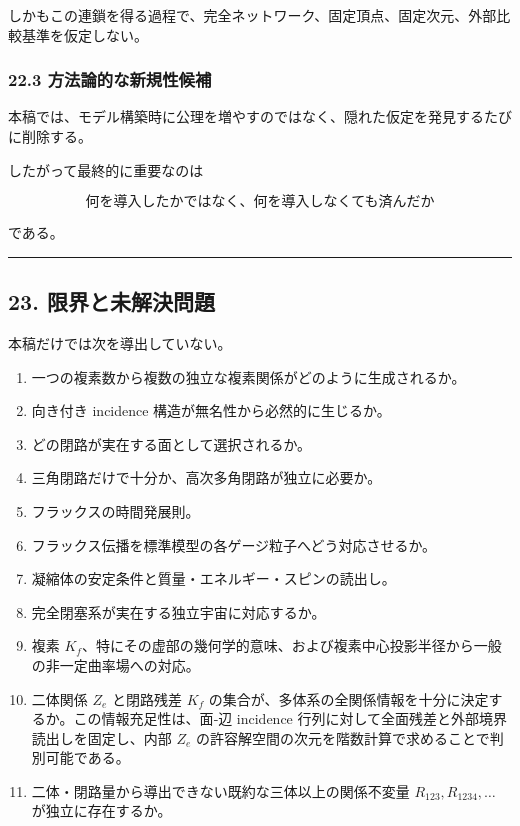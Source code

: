\documentclass[
  a4paper,
]{ltjsarticle}
\providecommand{\tightlist}{%
  \setlength{\itemsep}{0pt}\setlength{\parskip}{0pt}}
\begin{document}
しかもこの連鎖を得る過程で、完全ネットワーク、固定頂点、固定次元、外部比較基準を仮定しない。

\subsubsection{22.3
方法論的な新規性候補}\label{ux65b9ux6cd5ux8ad6ux7684ux306aux65b0ux898fux6027ux5019ux88dc}

本稿では、モデル構築時に公理を増やすのではなく、隠れた仮定を発見するたびに削除する。

したがって最終的に重要なのは

\[
\boxed{\text{何を導入したかではなく、何を導入しなくても済んだか}}
\]

である。

\begin{center}\rule{0.5\linewidth}{0.5pt}\end{center}

\subsection{23.
限界と未解決問題}\label{ux9650ux754cux3068ux672aux89e3ux6c7aux554fux984c}

本稿だけでは次を導出していない。

\begin{enumerate}
\def\labelenumi{\arabic{enumi}.}
\tightlist
\item
  一つの複素数から複数の独立な複素関係がどのように生成されるか。
\item
  向き付き incidence 構造が無名性から必然的に生じるか。
\item
  どの閉路が実在する面として選択されるか。
\item
  三角閉路だけで十分か、高次多角閉路が独立に必要か。
\item
  フラックスの時間発展則。
\item
  フラックス伝播を標準模型の各ゲージ粒子へどう対応させるか。
\item
  凝縮体の安定条件と質量・エネルギー・スピンの読出し。
\item
  完全閉塞系が実在する独立宇宙に対応するか。
\item
  複素
  \(K_f\)、特にその虚部の幾何学的意味、および複素中心投影半径から一般の非一定曲率場への対応。
\item
  二体関係 \(Z_e\) と閉路残差 \(K_f\)
  の集合が、多体系の全関係情報を十分に決定するか。この情報充足性は、面‐辺
  incidence 行列に対して全面残差と外部境界読出しを固定し、内部 \(Z_e\)
  の許容解空間の次元を階数計算で求めることで判別可能である。
\item
  二体・閉路量から導出できない既約な三体以上の関係不変量
  \(R_{123},R_{1234},\ldots\) が独立に存在するか。
\end{enumerate}
\end{document}
